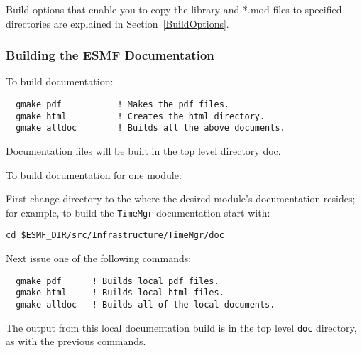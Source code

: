 Build options that enable you to copy the library and *.mod files to
specified directories are explained in Section~\ref{BuildOptions}. 

\subsubsection{Building the ESMF Documentation}
\label{BuildDocumentation}

\noindent To build documentation:
\begin{verbatim}
  gmake pdf           ! Makes the pdf files.
  gmake html          ! Creates the html directory.
  gmake alldoc        ! Builds all the above documents.
\end{verbatim}

\noindent Documentation files will be built in the top level directory doc.

\noindent To build documentation for one module:

\noindent First change directory to the where the desired module's documentation 
resides; for example, to build the {\tt TimeMgr} documentation start
with:

\begin{verbatim}
cd $ESMF_DIR/src/Infrastructure/TimeMgr/doc
\end{verbatim}

\noindent Next issue one of the following commands:
\begin{verbatim}
  gmake pdf      ! Builds local pdf files.
  gmake html     ! Builds local html files.
  gmake alldoc   ! Builds all of the local documents.
\end{verbatim}

\noindent The output from this local documentation build is in the top 
level {\tt doc} directory, as with the previous commands.






